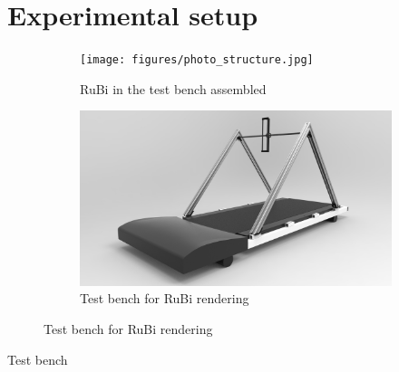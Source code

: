 \chapter{Experimental setup} %
\label{cha:experiments}

\begin{figure}[ht!]
    \centering
    \begin{subfigure}[b]{0.49\textwidth}
        \texttt{[image: figures/photo\_structure.jpg]}
        \caption{RuBi in the test bench assembled}
        \label{fig:photo_structure}
    \end{subfigure}
    \begin{subfigure}[b]{0.49\textwidth}
        \includegraphics[width=\textwidth]{figures/legs_structure.jpg}
        \caption{Test bench for RuBi rendering}
        \label{fig:legs_structure}
    \end{subfigure}
\end{figure}  

Test bench


